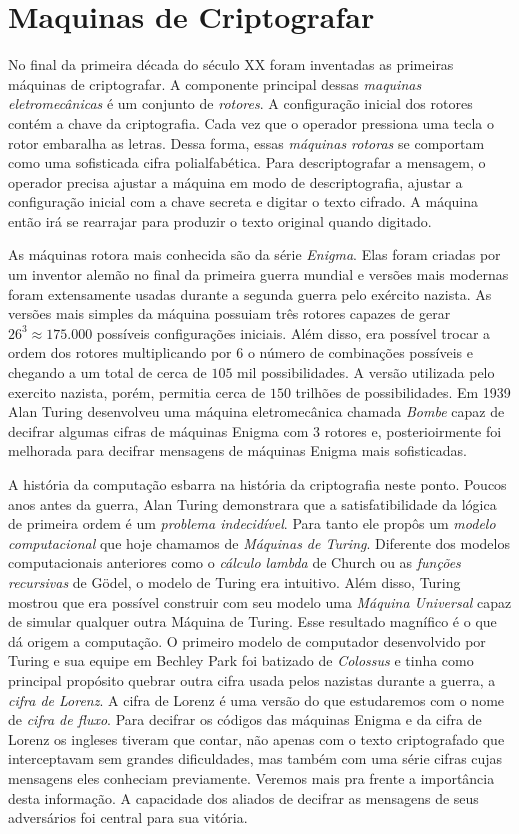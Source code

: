 \section{Maquinas de Criptografar}
\label{sec:maquinas}

No final da primeira década do século XX foram inventadas as primeiras máquinas de criptografar.
A componente principal dessas {\em maquinas eletromecânicas} é um conjunto de {\em rotores}.
A configuração inicial dos rotores contém a chave da criptografia.
Cada vez que o operador pressiona uma tecla o rotor embaralha as letras.
Dessa forma, essas {\em máquinas rotoras} se comportam como uma sofisticada cifra polialfabética.
Para descriptografar a mensagem, o operador precisa ajustar a máquina em modo de descriptografia, ajustar a configuração inicial com a chave secreta e digitar o texto cifrado.
A máquina então irá se rearrajar para produzir o texto original quando digitado.

As máquinas rotora mais conhecida são da série {\em Enigma}.
Elas foram criadas por um inventor alemão no final da primeira guerra mundial e versões mais modernas foram extensamente usadas durante a segunda guerra pelo exército nazista.
As versões mais simples da máquina possuiam três rotores capazes de gerar $26^3 \approx 175.000$ possíveis configurações iniciais.
Além disso, era possível trocar a ordem dos rotores multiplicando por $6$ o número de combinações possíveis e chegando a um total de cerca de $105$ mil possibilidades.
A versão utilizada pelo exercito nazista, porém, permitia cerca de $150$ trilhões de possibilidades.
Em 1939 Alan Turing desenvolveu uma máquina eletromecânica chamada {\em Bombe} capaz de decifrar algumas cifras de máquinas Enigma com 3 rotores e, posterioirmente foi melhorada para decifrar mensagens de máquinas Enigma mais sofisticadas.

A história da computação esbarra na história da criptografia neste ponto.
Poucos anos antes da guerra, Alan Turing demonstrara que a satisfatibilidade da lógica de primeira ordem é um {\em problema indecidível}.
Para tanto ele propôs um {\em modelo computacional} que hoje chamamos de {\em Máquinas de Turing}.
Diferente dos modelos computacionais anteriores como o {\em cálculo lambda} de Church ou as {\em funções recursivas} de Gödel, o modelo de Turing era intuitivo.
Além disso, Turing mostrou que era possível construir com seu modelo uma {\em Máquina Universal} capaz de simular qualquer outra Máquina de Turing.
Esse resultado magnífico é o que dá origem a computação.
O primeiro modelo de computador desenvolvido por Turing e sua equipe em Bechley Park foi batizado de {\em Colossus} e tinha como principal propósito quebrar outra cifra usada pelos nazistas durante a guerra, a {\em cifra de Lorenz}.
A cifra de Lorenz é uma versão do que estudaremos com o nome de {\em cifra de fluxo}.
Para decifrar os códigos das máquinas Enigma e da cifra de Lorenz os ingleses tiveram que contar, não apenas com o texto criptografado que interceptavam sem grandes dificuldades, mas também com uma série cifras cujas mensagens eles conheciam previamente.
Veremos mais pra frente a importância desta informação. 
A capacidade dos aliados de decifrar as mensagens de seus adversários foi central para sua vitória. 

